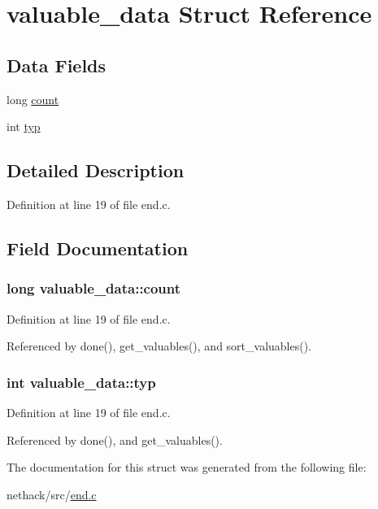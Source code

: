 \hypertarget{structvaluable__data}{\section{valuable\+\_\+data Struct Reference}
\label{structvaluable__data}
}
\subsection*{Data Fields}
\begin{DoxyCompactItemize}
\item 
long \hyperlink{structvaluable__data_a0c5f9df0056287f8a8220d1d7a81781d}{count}
\item 
int \hyperlink{structvaluable__data_a3e054ff977428718f17e0f1a4aa6eef1}{typ}
\end{DoxyCompactItemize}


\subsection{Detailed Description}


Definition at line 19 of file end.\+c.



\subsection{Field Documentation}
\hypertarget{structvaluable__data_a0c5f9df0056287f8a8220d1d7a81781d}{
\subsubsection[{count}]{\setlength{\rightskip}{0pt plus 5cm}long valuable\+\_\+data\+::count}}\label{structvaluable__data_a0c5f9df0056287f8a8220d1d7a81781d}


Definition at line 19 of file end.\+c.



Referenced by done(), get\+\_\+valuables(), and sort\+\_\+valuables().

\hypertarget{structvaluable__data_a3e054ff977428718f17e0f1a4aa6eef1}{
\subsubsection[{typ}]{\setlength{\rightskip}{0pt plus 5cm}int valuable\+\_\+data\+::typ}}\label{structvaluable__data_a3e054ff977428718f17e0f1a4aa6eef1}


Definition at line 19 of file end.\+c.



Referenced by done(), and get\+\_\+valuables().



The documentation for this struct was generated from the following file\+:\begin{DoxyCompactItemize}
\item 
nethack/src/\hyperlink{end_8c}{end.\+c}\end{DoxyCompactItemize}
